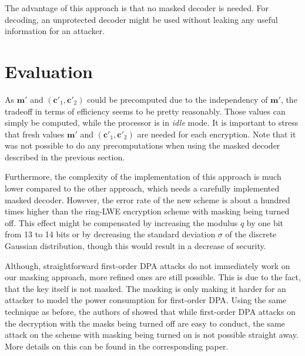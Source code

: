 The advantage of this approach is that no masked decoder is needed. For decoding, an unprotected decoder might be used without leaking any useful information for an attacker.

\section{Evaluation}
As \(\textbf{m}'\) and \((\textbf{c}'_1, \textbf{c}'_2)\) could be precomputed due to the independency of \(\textbf{m}'\), the tradeoff in terms of efficiency seems to be pretty reasonably. Those values can simply be computed, while the processor is in \textit{idle} mode. It is important to stress that fresh values \(\textbf{m}'\) and \((\textbf{c}'_1, \textbf{c}'_2)\) are needed for each encryption. Note that it was not possible to do any precomputations when using the masked decoder described in the previous section.

Furthermore, the complexity of the implementation of this approach is much lower compared to the other approach, which needs a carefully implemented masked decoder. However, the error rate of the new scheme is about a hundred times higher than the \ac{ring-LWE} encryption scheme with masking being turned off. This effect might be compensated by increasing the modulus \(q\) by one bit from 13 to 14 bits or by decreasing the standard deviation \(\sigma\) of the discrete Gaussian distribution, though this would result in a decrease of security.

Although, straightforward first-order \ac{DPA} attacks do not immediately work on our masking approach, more refined ones are still possible. This is due to the fact, that the key itself is not masked. The masking is only making it harder for an attacker to model the power consumption for first-order \ac{DPA}. Using the same technique as before, the authors of \cite{Reparaz2016} showed that while first-order \ac{DPA} attacks on the decryption with the masks being turned off are easy to conduct, the same attack on the scheme with masking being turned on is not possible straight away. More details on this can be found in the corresponding paper.


